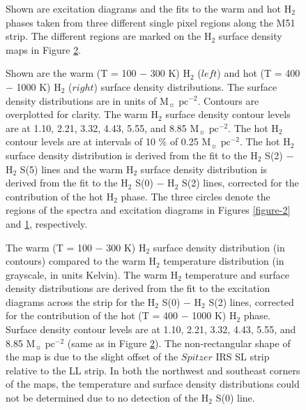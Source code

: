 \documentclass[12pt,preprint]{aastex}
\begin{document}
\clearpage

\begin{figure}
\caption{Shown are excitation diagrams and the fits to the warm
and hot H$_2$ phases taken from three different single pixel regions along the M51 strip. 
The different regions are marked on the H$_2$ surface density maps 
in Figure \ref{figure-5}.}
\label{figure-4}
\end{figure}

\clearpage

\begin{figure}
\caption{Shown are the warm (T = 100 $-$ 300 K) 
H$_2$ ($left$) and hot (T = 400 $-$ 1000 K) 
H$_2$ ($right$) surface density distributions.  The surface density
 distributions are in units of $\mathrm{M_\sun}$ 
$\mathrm{pc^{-2}}$.   Contours are overplotted for clarity.  
The warm H$_2$ surface density contour levels are at 
1.10, 2.21, 3.32, 4.43, 5.55, and 8.85 $\mathrm{M_\sun}$ $\mathrm{pc^{-2}}$.  
The hot H$_2$ contour 
levels are at intervals of 10 \% of 0.25 $\mathrm{M_\sun}$ $\mathrm{pc^{-2}}$.  
The hot H$_2$ surface density distribution is derived 
from the fit to the H$_2$ S(2) $-$ 
H$_2$ S(5) lines and the warm H$_2$ 
surface density distribution is derived from the fit to the 
H$_2$ S(0) $-$ H$_2$ S(2) lines, 
corrected for the contribution of the hot H$_2$ phase.
The three circles denote the regions of the spectra and excitation diagrams in Figures 
\ref{figure-2} and \ref{figure-4}, respectively.}
\label{figure-5}
\end{figure}

\clearpage

\begin{figure}
\caption{The warm (T = 100 $-$ 300 K) H$_2$ surface 
density distribution (in contours) compared 
to the warm H$_2$ temperature distribution 
(in grayscale, in units Kelvin).  The warm H$_2$ 
temperature and surface density distributions are derived from the fit to the excitation 
diagrams across the strip for the H$_2$ S(0) $-$ H$_2$ S(2) lines, 
corrected for the contribution of the hot (T = 400 $-$ 1000 K) H$_2$ phase.  
Surface density contour levels are at 
1.10, 2.21, 3.32, 4.43, 5.55, and 8.85 $\mathrm{M_\sun}$ $\mathrm{pc^{-2}}$ 
(same as in Figure \ref{figure-5}). The non-rectangular shape of the 
map is due to the slight offset of the $Spitzer$ IRS SL 
strip relative to the LL strip.  In both the northwest and southeast corners 
of the maps, the temperature and surface density distributions could not 
be determined due to no detection of the H$_2$ S(0) line.}
\label{figure-6}
\end{figure}
\end{document}

